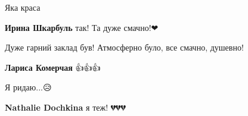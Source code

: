 
Яка краса

\begin{itemize} %
\textbf{Ирина Шкарбуль} так! Та дуже смачно!❤
\end{itemize} %


Дуже гарний заклад був! Атмосферно було, все смачно, душевно!

\textbf{Лариса Комерчая} 👍👍👍


Я ридаю...😥🙏🇺🇦

\textbf{Nathalie Dochkina} я теж! 💔💔💔
